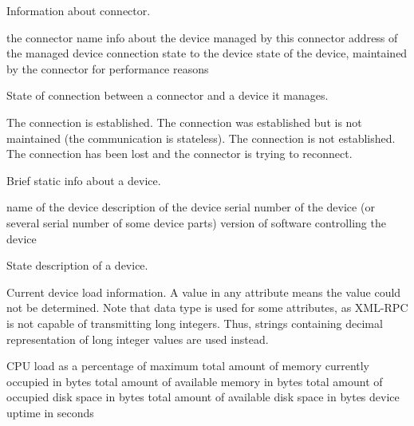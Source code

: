 \begin{Api}

Information about connector.
\begin{ApiClassAttributes}
 the connector name
 info about the device managed by this connector
 address of the managed device
 connection state to the device
 state of the device, maintained by the connector for performance reasons
\end{ApiClassAttributes}

State of connection between a connector and a device it manages.
\begin{ApiEnumValues}
 The connection is established.
 The connection was established but is not maintained (the communication is stateless).
 The connection is not established.
 The connection has been lost and the connector is trying to reconnect.
\end{ApiEnumValues}

Brief static info about a device.
\begin{ApiClassAttributes}
 name of the device
 description of the device
 serial number of the device (or several serial number of some device parts)
 version of software controlling the device
\end{ApiClassAttributes}

State description of a device.
\todo{}

Current device load information. A  value in any attribute means the value could not be determined. Note that  data type is used for some attributes, as XML-RPC is not capable of transmitting long integers. Thus, strings containing decimal representation of long integer values are used instead.
\begin{ApiClassAttributes}
 CPU load as a percentage of maximum
 total amount of memory currently occupied in bytes
 total amount of available memory in bytes
 total amount of occupied disk space in bytes
 total amount of available disk space in bytes
 device uptime in seconds
\end{ApiClassAttributes}


\end{Api}
